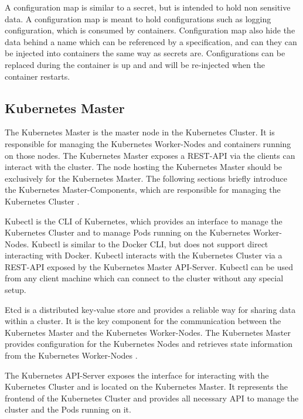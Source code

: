 A configuration map is similar to a secret, but is intended to hold non sensitive data. A configuration map  is meant to hold configurations such as logging configuration, which is consumed by containers. Configuration map also hide the data behind a name which can be referenced by a specification, and can they can be injected into containers the same way as secrets are. Configurations can be replaced during the container is up and and will be re-injected when the container restarts.

\subsection{Kubernetes Master}
\label{sec:caas-kubernetes-master}
The Kubernetes Master is the master node in the Kubernetes Cluster. It is responsible for managing the Kubernetes Worker-Nodes and containers running on those nodes. The Kubernetes Master exposes a REST-API via the clients can interact with the cluster. The node hosting the Kubernetes Master should be exclusively for the Kubernetes Master. The following sections briefly introduce the Kubernetes Master-Components, which are responsible for managing the Kubernetes Cluster \cite{CNCFKubernetesComponents2018}.

Kubectl is the CLI of Kubernetes, which provides an interface to manage the Kubernetes Cluster and to manage Pods running on the Kubernetes Worker-Nodes. Kubectl is similar to the Docker CLI, but does not support direct interacting with Docker. Kubectl interacts with the Kubernetes Cluster via a REST-API exposed by the Kubernetes Master API-Server. Kubectl can be used from any client machine which can connect to the cluster without any special setup.

Etcd is a distributed key-value store and provides a reliable way for sharing data within a cluster. It is the key component for the communication between the Kubernetes Master and the Kubernetes Worker-Nodes. The Kubernetes Master provides configuration for the Kubernetes Nodes and retrieves state information from the Kubernetes Worker-Nodes \cite{CoreOSETCD2018}.

The Kubernetes API-Server exposes the interface for interacting with the Kubernetes Cluster and is located on the Kubernetes Master. It represents the frontend of the Kubernetes Cluster and provides all necessary API to manage the cluster and the Pods running on it.

